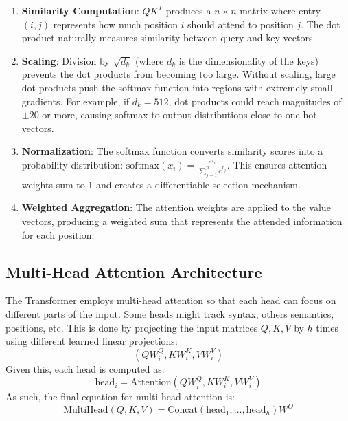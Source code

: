 \begin{enumerate}
   \item \textbf{Similarity Computation}: $QK^T$ produces a $n \times n$ matrix where entry $(i,j)$ represents how much position $i$ should attend to position $j$. The dot product naturally measures similarity between query and key vectors.

   \item \textbf{Scaling}: Division by $\sqrt{d_k}$ (where $d_k$ is the dimensionality of the keys) prevents the dot products from becoming too large. Without scaling, large dot products push the softmax function into regions with extremely small gradients. For example, if $d_k = 512$, dot products could reach magnitudes of $\pm 20$ or more, causing softmax to output distributions close to one-hot vectors.

   \item \textbf{Normalization}: The softmax function converts similarity scores into a probability distribution: $\text{softmax}(x_i) = \frac{e^{x_i}}{\sum_{j=1}^n e^{x_j}}$. This ensures attention weights sum to 1 and creates a differentiable selection mechanism.

   \item \textbf{Weighted Aggregation}: The attention weights are applied to the value vectors, producing a weighted sum that represents the attended information for each position.
\end{enumerate}

\subsection{Multi-Head Attention Architecture}

The Transformer employs multi-head attention so that each head can focus on different parts of the input. Some heads might track syntax, others semantics, positions, etc. This is done by projecting the input matrices $Q, K, V$ by $h$ times using different learned linear projections:
\begin{equation}
(QW_i^Q, KW_i^K, VW_i^V)
\end{equation}
Given this, each head is computed as:
\begin{equation}
\text{head}_i = \text{Attention}(QW_i^Q, KW_i^K, VW_i^V)
\end{equation}
As such, the final equation for multi-head attention is:
\begin{equation}
\text{MultiHead}(Q, K, V) = \text{Concat}(\text{head}_1, \ldots, \text{head}_h)W^O
\end{equation}

